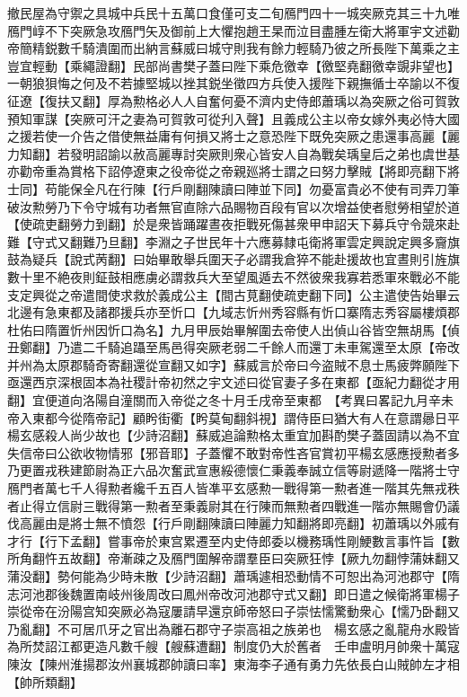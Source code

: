 撤民屋為守禦之具城中兵民十五萬口食僅可支二旬鴈門四十一城突厥克其三十九唯鴈門崞不下突厥急攻鴈門矢及御前上大懼抱趙王杲而泣目盡腫左衛大將軍宇文述勸帝簡精鋭數千騎潰圍而出納言蘇威曰城守則我有餘力輕騎乃彼之所長陛下萬乘之主豈宜輕動【乘繩證翻】民部尚書樊子蓋曰陛下乘危徼幸【徼堅堯翻徼幸覬非望也】一朝狼狽悔之何及不若據堅城以挫其鋭坐徵四方兵使入援陛下親撫循士卒諭以不復征遼【復扶又翻】厚為勲格必人人自奮何憂不濟内史侍郎蕭瑀以為突厥之俗可賀敦預知軍謀【突厥可汗之妻為可賀敦可從刋入聲】且義成公主以帝女嫁外夷必恃大國之援若使一介告之借使無益庸有何損又將士之意恐陛下既免突厥之患還事高麗【麗力知翻】若發明詔諭以赦高麗專討突厥則衆心皆安人自為戰矣瑀皇后之弟也虞世基亦勸帝重為賞格下詔停遼東之役帝從之帝親廵將士謂之曰努力擊賊【將即亮翻下將士同】苟能保全凡在行陳【行戶剛翻陳讀曰陣並下同】勿憂富貴必不使有司弄刀筆破汝勲勞乃下令守城有功者無官直除六品賜物百段有官以次增益使者慰勞相望於道【使疏吏翻勞力到翻】於是衆皆踊躍晝夜拒戰死傷甚衆甲申詔天下募兵守令競來赴難【守式又翻難乃旦翻】李淵之子世民年十六應募隸屯衛將軍雲定興說定興多齎旗鼓為疑兵【說式苪翻】曰始畢敢舉兵圍天子必謂我倉猝不能赴援故也宜晝則引旌旗數十里不絶夜則鉦鼓相應虜必謂救兵大至望風遁去不然彼衆我寡若悉軍來戰必不能支定興從之帝遣間使求救於義成公主【間古莧翻使疏吏翻下同】公主遣使告始畢云北邊有急東都及諸郡援兵亦至忻口【九域志忻州秀容縣有忻口寨隋志秀容屬樓煩郡杜佑曰隋置忻州因忻口為名】九月甲辰始畢解圍去帝使人出偵山谷皆空無胡馬【偵丑鄭翻】乃遣二千騎追躡至馬邑得突厥老弱二千餘人而還丁未車駕還至太原【帝改并州為太原郡騎奇寄翻還從宣翻又如字】蘇威言於帝曰今盗賊不息士馬疲弊願陛下亟還西京深根固本為社稷計帝初然之宇文述曰從官妻子多在東都【亟紀力翻從才用翻】宜便道向洛陽自潼關而入帝從之冬十月壬戌帝至東都　【考異曰畧記九月辛未帝入東都今從隋帝記】顧盻街衢【盻莫甸翻斜視】謂侍臣曰猶大有人在意謂曏日平楊玄感殺人尚少故也【少詩沼翻】蘇威追論勲格太重宜加斟酌樊子蓋固請以為不宜失信帝曰公欲收物情邪【邪音耶】子蓋懼不敢對帝性吝官賞初平楊玄感應授勲者多乃更置戎秩建節尉為正六品次奮武宣惠綏德懷仁秉義奉誠立信等尉遞降一階將士守鴈門者萬七千人得勲者纔千五百人皆凖平玄感勲一戰得第一勲者進一階其先無戎秩者止得立信尉三戰得第一勲者至秉義尉其在行陳而無勲者四戰進一階亦無賜會仍議伐高麗由是將士無不憤怨【行戶剛翻陳讀曰陣麗力知翻將即亮翻】初蕭瑀以外戚有才行【行下孟翻】嘗事帝於東宫累遷至内史侍郎委以機務瑀性剛鯁數言事忤旨【數所角翻忤五故翻】帝漸疎之及鴈門圍解帝謂羣臣曰突厥狂悖【厥九勿翻悖蒲妹翻又蒲没翻】勢何能為少時未散【少詩沼翻】蕭瑀遽相恐動情不可恕出為河池郡守【隋志河池郡後魏置南岐州後周改曰鳳州帝改河池郡守式又翻】即日遣之候衛將軍楊子崇從帝在汾陽宫知突厥必為寇屢請早還京師帝怒曰子崇怯懦驚動衆心【懦乃卧翻又乃亂翻】不可居爪牙之官出為離石郡守子崇高祖之族弟也　楊玄感之亂龍舟水殿皆為所焚詔江都更造凡數千艘【艘蘇遭翻】制度仍大於舊者　壬申盧明月帥衆十萬寇陳汝【陳州淮揚郡汝州襄城郡帥讀曰率】東海李子通有勇力先依長白山賊帥左才相【帥所類翻】

